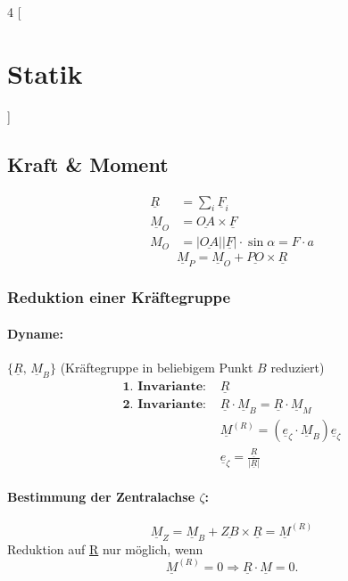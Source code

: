 \documentclass{article}
\begin{document}
	\begin{multicols*}{4}
		[\section{Statik}] %
			\subsection{Kraft \& Moment} %
				\begin{align*}
					\underline{R} &= \sum_i \underline{F}_i \\
					\underline{M}_O &= \underline{OA} \times \underline{F} \\
					M_O &= |\underline{OA}| |\underline{F}| \cdot \sin{\alpha} = F \cdot a
				\end{align*}
				\[
					\underline{M}_P = \underline{M}_O + \underline{PO} \times \underline{R}
				\]
				\subsubsection{Reduktion einer Kräftegruppe} %
					\paragraph{Dyname:} %
						$\{\underline{R},\,\underline{M}_B\}$ (Kräftegruppe in beliebigem Punkt $B$ reduziert)
					\begin{align*}
						\textbf{1. Invariante:\ } & \underline{R} \\
						\textbf{2. Invariante:\ } & \underline{R} \cdot \underline{M}_B = \underline{R} \cdot \underline{M}_M \\
						& \underline{M}^{(R)} = \left(\underline{e}_{\zeta} \cdot \underline{M}_B\right) \underline{e}_{\zeta} \\
						& \underline{e}_{\zeta} = \frac{\underline{R}}{|\underline{R}|}
					\end{align*}
					\paragraph{Bestimmung der Zentralachse $\zeta$:} %
						\[
							\underline{M}_Z = \underline{M}_B + \underline{ZB} \times \underline{R} = \underline{M}^{(R)}
						\]
						Reduktion auf \underline{R} nur möglich, wenn
						\[
							\underline{M}^{(R)} = 0 \Rightarrow \underline{R} \cdot \underline{M} = 0.
						\]

\end{multicols*}
\end{document}
